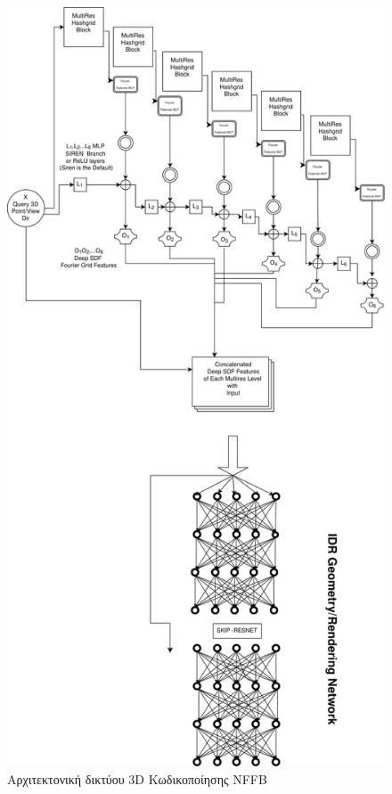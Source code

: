     \begin{figure}[ht]
        \centering
        \includegraphics[height=0.72\textheight]{images/chapter4_img/IDR_Embeddings_Architecture-Neural Fourier Filter Banks.jpg}
        \caption{Αρχιτεκτονική δικτύου 3D Κωδικοποίησης NFFB}
        \label{fig:nffbarchitecture}
    \end{figure}
    \clearpage
